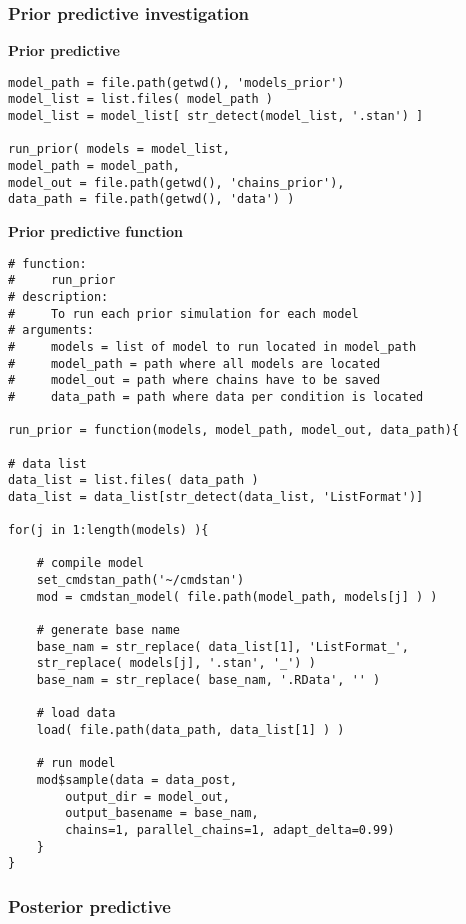 
\subsubsection{Prior predictive investigation}

\noindent \textbf{Prior predictive}
%
\begin{lstlisting}
model_path = file.path(getwd(), 'models_prior')
model_list = list.files( model_path )
model_list = model_list[ str_detect(model_list, '.stan') ]

run_prior( models = model_list,
model_path = model_path,
model_out = file.path(getwd(), 'chains_prior'),
data_path = file.path(getwd(), 'data') )
\end{lstlisting}


\noindent \textbf{Prior predictive function}
%
\begin{lstlisting}
# function:
#     run_prior
# description:  
#     To run each prior simulation for each model
# arguments:
#     models = list of model to run located in model_path
#     model_path = path where all models are located
#     model_out = path where chains have to be saved
#     data_path = path where data per condition is located

run_prior = function(models, model_path, model_out, data_path){
	
# data list
data_list = list.files( data_path )
data_list = data_list[str_detect(data_list, 'ListFormat')]
	
for(j in 1:length(models) ){
		
	# compile model
	set_cmdstan_path('~/cmdstan')
	mod = cmdstan_model( file.path(model_path, models[j] ) )
	
	# generate base name
	base_nam = str_replace( data_list[1], 'ListFormat_', 
	str_replace( models[j], '.stan', '_') )
	base_nam = str_replace( base_nam, '.RData', '' )
		
	# load data
	load( file.path(data_path, data_list[1] ) )
		
	# run model
	mod$sample(data = data_post, 
		output_dir = model_out, 
		output_basename = base_nam,
		chains=1, parallel_chains=1, adapt_delta=0.99)
	}
}
\end{lstlisting}


\subsubsection{Posterior predictive}

